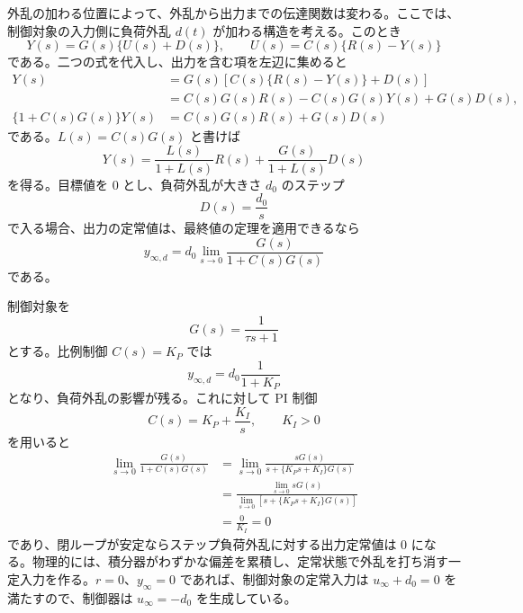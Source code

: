 外乱の加わる位置によって、外乱から出力までの伝達関数は変わる。ここでは、制御対象の入力側に負荷外乱 $d(t)$ が加わる構造を考える。このとき
\begin{equation}
  Y(s)=G(s)\{U(s)+D(s)\},
  \qquad
  U(s)=C(s)\{R(s)-Y(s)\}
\end{equation}
である。二つの式を代入し、出力を含む項を左辺に集めると
\begin{align}
  Y(s)
  &=G(s)\left[C(s)\{R(s)-Y(s)\}+D(s)\right]\\
  &=C(s)G(s)R(s)-C(s)G(s)Y(s)+G(s)D(s),\\
  \{1+C(s)G(s)\}Y(s)
  &=C(s)G(s)R(s)+G(s)D(s)
\end{align}
である。$L(s)=C(s)G(s)$ と書けば
\begin{equation}
  Y(s)=\frac{L(s)}{1+L(s)}R(s)
       +\frac{G(s)}{1+L(s)}D(s)
  \label{eq:load-disturbance-output}
\end{equation}
を得る。目標値を 0 とし、負荷外乱が大きさ $d_0$ のステップ
\begin{equation}
  D(s)=\frac{d_0}{s}
\end{equation}
で入る場合、出力の定常値は、最終値の定理を適用できるなら
\begin{equation}
  y_{\infty,d}
  =
  d_0\lim_{s\to0}\frac{G(s)}{1+C(s)G(s)}
  \label{eq:load-disturbance-final}
\end{equation}
である。

制御対象を
\begin{equation}
  G(s)=\frac{1}{\tau s+1}
\end{equation}
とする。比例制御 $C(s)=K_P$ では
\begin{equation}
  y_{\infty,d}
  =
  d_0\frac{1}{1+K_P}
\end{equation}
となり、負荷外乱の影響が残る。これに対して PI 制御
\begin{equation}
  C(s)=K_P+\frac{K_I}{s},
  \qquad K_I>0
\end{equation}
を用いると
\begin{align}
  \lim_{s\to0}\frac{G(s)}{1+C(s)G(s)}
  &=
  \lim_{s\to0}
  \frac{sG(s)}{s+\{K_Ps+K_I\}G(s)}\\
  &=
  \frac{\lim_{s\to0}sG(s)}
       {\lim_{s\to0}\left[s+\{K_Ps+K_I\}G(s)\right]}\\
  &=
  \frac{0}{K_I}
  =
  0
\end{align}
であり、閉ループが安定ならステップ負荷外乱に対する出力定常値は 0 になる。物理的には、積分器がわずかな偏差を累積し、定常状態で外乱を打ち消す一定入力を作る。$r=0$、$y_\infty=0$ であれば、制御対象の定常入力は $u_\infty+d_0=0$ を満たすので、制御器は $u_\infty=-d_0$ を生成している。

